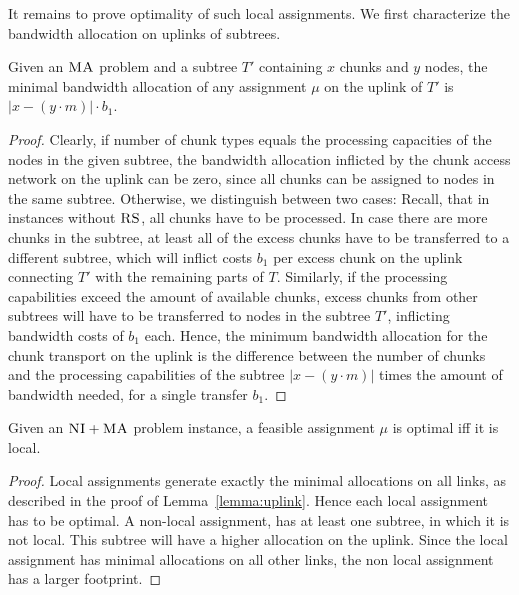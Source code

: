 \documentclass[9pt]{sigcomm-alternate}
\newcommand{\MaFactor}{m}
\newcommand{\VmChunkAssignment}{\mu}
\newcommand{\CC}{\textsc{NI}}
\newcommand{\RS}{\textsc{RS}}
\newcommand{\MA}{\textsc{MA}}
\newcommand{\Tree}{\ensuremath{T}}
\newcommand{\CostTrans}{\ensuremath{b_1}}
\begin{document}
It remains to prove optimality of such local assignments.
We first characterize the bandwidth allocation on uplinks of subtrees.
\begin{lemma}\label{lem:uplink-alloc}
Given an $\MA$ problem and a subtree $\Tree'$
containing $x$
chunks and $y$ nodes, the minimal bandwidth allocation of any
assignment
$\VmChunkAssignment$ on the uplink of $\Tree'$ is $|x-(y\cdot\MaFactor)|\cdot
\CostTrans$.\label{lemma:uplink}
\end{lemma}
\begin{proof}
Clearly, if number of chunk types equals the processing capacities of the nodes in the given subtree,
the bandwidth allocation inflicted by the chunk access network on the uplink can be
zero, since all chunks can be assigned to nodes in the same subtree.
Otherwise, we distinguish between two cases: Recall, that in instances
without $\RS$, all chunks have to be processed. In case
there are more chunks in the subtree, at least all of the excess chunks have to
be transferred to a different subtree, which will
inflict costs $\CostTrans$ per excess chunk on the uplink connecting $\Tree'$
with the
remaining parts of $\Tree$. Similarly, if the processing capabilities exceed the
amount of
available chunks, excess chunks from other subtrees will have to be transferred
to
nodes in the subtree $\Tree'$, inflicting bandwidth costs of $\CostTrans$ each.
Hence, the minimum bandwidth allocation for the chunk transport on the uplink
is the difference between the number of chunks and the processing capabilities
of the subtree $|x-(y\cdot\MaFactor)|$ times the amount of bandwidth needed,
for a single transfer $\CostTrans$.
\end{proof}


\begin{theorem}
Given an $\CC+\MA$ problem instance, a feasible assignment $\VmChunkAssignment$
is optimal iff it is local.
\label{thm:local_optimal}
\end{theorem}

\begin{proof}
Local assignments generate exactly the minimal allocations on all links, as described in
the proof of
Lemma~\ref{lemma:uplink}. Hence
each local assignment has to be optimal. A non-local assignment, has at least
one subtree, in which it is not local. This subtree will have a higher
allocation on the uplink. Since the local assignment has minimal allocations
on all other links, the non local assignment has a larger footprint.
\end{proof}
\end{document}
